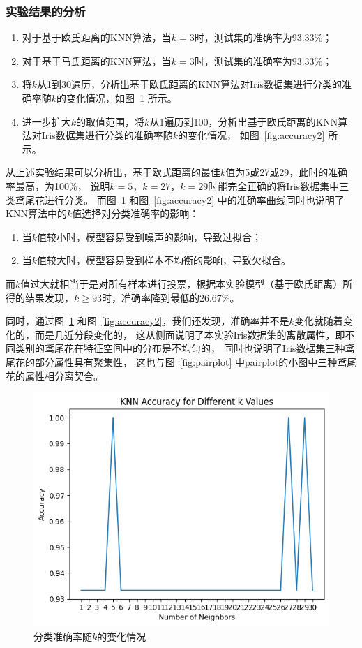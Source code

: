 \documentclass[12pt]{article}
\begin{document}
\subsubsection{实验结果的分析}

\begin{enumerate}
  \item 对于基于欧氏距离的KNN算法，当$k=3$时，测试集的准确率为93.33\%；
  \item 对于基于马氏距离的KNN算法，当$k=3$时，测试集的准确率为93.33\%；
  \item 将$k$从1到30遍历，分析出基于欧氏距离的KNN算法对Iris数据集进行分类的准确率随$k$的变化情况，如图~\ref{fig:accuracy} 所示。
  \item 进一步扩大$k$的取值范围，将$k$从1遍历到100，分析出基于欧氏距离的KNN算法对Iris数据集进行分类的准确率随$k$的变化情况，
        如图~\ref{fig:accuracy2} 所示。
\end{enumerate}
从上述实验结果可以分析出，基于欧式距离的最佳$k$值为5或27或29，此时的准确率最高，为100\%，
说明$k=5$，$k=27$，$k=29$时能完全正确的将Iris数据集中三类鸢尾花进行分类。
而图~\ref{fig:accuracy} 和图~\ref{fig:accuracy2} 中的准确率曲线同时也说明了KNN算法中的$k$值选择对分类准确率的影响：
\begin{enumerate}
  \item 当$k$值较小时，模型容易受到噪声的影响，导致过拟合；
  \item 当$k$值较大时，模型容易受到样本不均衡的影响，导致欠拟合。
\end{enumerate}
而$k$值过大就相当于是对所有样本进行投票，根据本实验模型（基于欧氏距离）所得的结果发现，$k \geq 93$时，准确率降到最低的26.67\%。

同时，通过图~\ref{fig:accuracy} 和图~\ref{fig:accuracy2}，我们还发现，准确率并不是$k$变化就随着变化的，而是几近分段变化的，
这从侧面说明了本实验Iris数据集的离散属性，即不同类别的鸢尾花在特征空间中的分布是不均匀的，
同时也说明了Iris数据集三种鸢尾花的部分属性具有聚集性，
这也与图~\ref{fig:pairplot} 中pairplot的小图中三种鸢尾花的属性相分离契合。

\begin{figure}[htbp]
  \centering
  \includegraphics[scale=0.8]{figures/knn/accuracy.png}
  \caption{分类准确率随$k$的变化情况}
  \label{fig:accuracy}
\end{figure}
\end{document}
